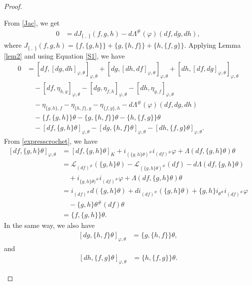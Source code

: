 \documentclass[a4paper,10pt]{article}
\numberwithin{equation}{section}
\theoremstyle{plain}
\begin{document}
\begin{proof}
\begin{itemize}
				From \eqref{Jac}, we get
				\begin{align}\label{S1}
					0 &=dJ_{\{\ ,\ \}}(f,g,h)-d\Lambda^{\#}(\varphi)(df,dg,dh),
				\end{align}
				where $J_{\{\ ,\ \}}(f,g,h)=\{f,\{g,h\}\}+\{g,\{h,f\}\}+\{h,\{f,g\}\}$.
				Applying Lemma \ref{lem2} and using Equation \eqref{S1}, we have
				\begin{align}\label{sr2}
					\nonumber
					0 &= [df,[dg,dh]_{\varphi,\theta}]_{\varphi,\theta}+[dg,[dh,df]_{\varphi,\theta}]_{\varphi,\theta}+[dh,[df,dg]_{\varphi,\theta}]_{\varphi,\theta}\\ \nonumber
					&\quad-[df,\eta_{h,g}]_{\varphi,\theta}-[dg,\eta_{f,h}]_{\varphi,\theta}-[dh,\eta_{g,f}]_{\varphi,\theta}\\ \nonumber
					&\quad-\eta_{\{g,h\},f}-\eta_{\{h,f\},g}-\eta_{\{f,g\},h}-d\Lambda^{\#}(\varphi)(df,dg,dh)\\ \nonumber
					&\quad-\{f,\{g,h\}\}\theta-\{g,\{h,f\}\}\theta-\{h,\{f,g\}\}\theta\\
					&\quad-[df,\{g,h\}\theta]_{\varphi,\theta}-[dg,\{h,f\}\theta]_{\varphi,\theta}-[dh,\{f,g\}\theta]_{\varphi,\theta}.
				\end{align}
				From \eqref{expresscrochet}, we have
				\begin{align}\label{sr1}
					\nonumber %
					[df,\{g,h\}\theta]_{\varphi,\theta} &=[df,\{g,h\}\theta]_K+i_{(\{g,h\}\theta)^{\#}}i_{(df)^{\#}}\varphi +\Lambda(df,\{g,h\}\theta)\theta\\ \nonumber
					&=\mathcal{L}_{(df)^{\#}}(\{g,h\}\theta)-\mathcal{L}_{(\{g,h\}\theta)^{\#}}(df)-d\Lambda(df,\{g,h\}\theta)\\ \nonumber
					&\quad+i_{\{g,h\}\theta)^{\#}}i_{(df)^{\#}}\varphi +\Lambda(df,\{g,h\}\theta)\theta\\ \nonumber
					&=i_{(df)^{\#}}d(\{g,h\}\theta)+ di_{(df)^{\#}}(\{g,h\}\theta)+\{g,h\}i_{\theta^{\#}}i_{(df)^{\#}}\varphi \\ \nonumber
					&\quad-\{g,h\}\theta^{\#}(df)\theta\\
					&=\{f,\{g,h\}\}\theta.
				\end{align}
				In the same way, we also have
				\begin{align}\label{sr10}
					[dg,\{h,f\}\theta]_{\varphi,\theta} &= \{g,\{h,f\}\}\theta,
				\end{align}
				and
				\begin{align} \label{sr11}
					[dh,\{f,g\}\theta]_{\varphi,\theta} &= \{h,\{f,g\}\}\theta.
				\end{align}
				

\end{itemize}
\end{proof}
\end{document}
